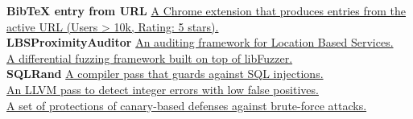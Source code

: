 
\begin{cvparagraph}

\textbf{BibTeX entry from URL} \hspace*{2pt} \href{https://chrome.google.com/webstore/detail/bibtex-entry-from-url/mgpmgkhhbjgkpnanlmlhibjfgpdpgjec} {A Chrome extension that produces  entries from the active URL (Users > 10k, Rating: 5 stars).}\\
\textbf{LBSProximityAuditor} \hspace*{7pt} \href{https://github.com/nettrino/LBSProximityAuditor}{An auditing framework for Location Based Services.}\\
\textbf{\nezha} \hspace*{69pt} \href{https://github.com/nezha-dt/nezha}
    {A differential fuzzing framework built on top of libFuzzer.}\\
\textbf{SQLRand} \hspace*{58pt}
\href{https://github.com/nettrino/SQLRand}{A compiler pass that guards against SQL injections.}\\
\textbf{\intflow} \hspace*{59pt} \href{https://github.com/nettrino/IntFlow}{An LLVM pass to detect integer errors with low false positives.}\\
\textbf{\dynaguard} \hspace*{46pt}
\href{https://github.com/nettrino/DynaGuard}{A set of protections of canary-based defenses against brute-force attacks.}
\end{cvparagraph}
